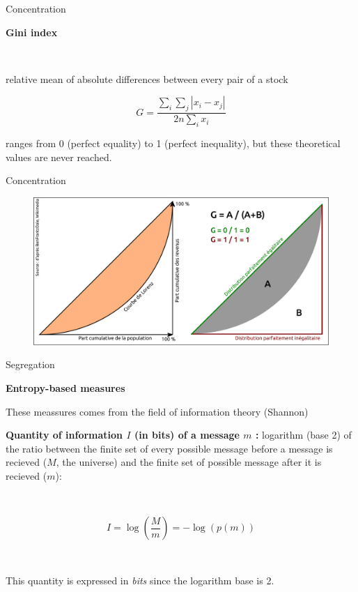 \begin{frame}{Concentration}

\textbf{Gini index}

~

relative mean of absolute differences between every pair of a stock 

\begin{equation}
\nonumber
G = \frac{\sum_i \sum_j |x_i - x_j|}{2n \sum_i x_i}
\end{equation}


ranges from 0 (perfect equality) to 1 (perfect inequality), but these theoretical values are never reached.





\end{frame}	



\begin{frame}{Concentration}


\begin{figure}
\includegraphics[width=12cm]{Lorenz.pdf}
\end{figure}

\end{frame}


\begin{frame}{Segregation}

\textbf{Entropy-based measures}

These meassures comes from the field of information theory (Shannon) ~

\textbf{Quantity of information $I$ (in bits) of a message $m$ :} logarithm (base 2) of the ratio between the finite set of every possible message before a message is recieved ($M$, the universe) and  the finite set of possible message after it is recieved ($m$):

~

\begin{equation}
\nonumber
  I = \log\left(\frac{M}{m} \right) = - \log(p(m))
\end{equation}

~

This quantity is expressed in \emph{bits} since the logarithm base is 2.

\end{frame}


